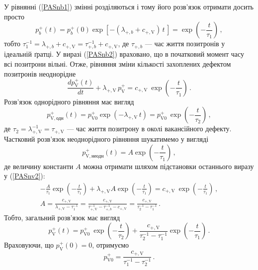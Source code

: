 У рівнянні (\ref{PASnb1}) змінні розділяються і тому його розв'язок отримати досить просто
\begin{equation}\label{PASnb2}
p_{b}^+(t)=p_{b}^+(0)\exp\left[-(\lambda_{+,b}+c_{+,\mathrm{V}})\,t\,\right]=\exp\left(-\frac{t}{\tau_1}\right)\,,
\end{equation}
тобто $\tau_1^{-1}=\lambda_{+,b}+c_{+,\mathrm{V}}=\tau_{+,b}^{-1}+c_{+,\mathrm{V}}$,
де $\tau_{+,b}$ --- час життя позитронів у ідеальній ґратці.
У виразі (\ref{PASnb2}) враховано, що в початковий момент часу всі позитрони вільні.
Отже, рівняння зміни кількості захоплених дефектом позитронів неоднорідне
\begin{equation}\label{PASnv2}
\frac{dp_{\mathrm{V}}^+(t)}{dt}+\lambda_{+,\mathrm{V}}\,p_{\mathrm{V}}^+=c_{+,\mathrm{V}}\:\exp\left(-\frac{t}{\tau_1}\right)\,.
\end{equation}
Розв'язок однорідного рівняння має вигляд
\begin{equation}
p_{\mathrm{V},\mbox{одн}}^+(t)=p_{\mathrm{V}0}^+\exp\left(-\lambda_{+,\mathrm{V}}\,t\right)
  =p_{\mathrm{V}0}^+\:\exp\left(-\frac{t}{\tau_2}\right)\,,
\end{equation}
де $\tau_2=\lambda_{+,\mathrm{V}}^{-1}=\tau_{+,\mathrm{V}}$ --- час життя позитрону в околі вакансійного дефекту.
Частковий розв'язок неоднорідного рівняння шукатимемо у вигляді
\begin{equation}
p_{\mathrm{V},\mbox{неодн}}^+(t)=A\exp\left(-\frac{t}{\tau_1}\right)\,,
\end{equation}
де величину константи $A$ можна отримати шляхом підстановки останнього виразу у (\ref{PASnv2}):
\begin{gather*}
-\frac{A}{\tau_1}\exp\left(-\frac{t}{\tau_1}\right)+\lambda_{+,\mathrm{V}}A\exp\left(-\frac{t}{\tau_1}\right)=c_{+,\mathrm{V}}\:\exp\left(-\frac{t}{\tau_1}\right)\,,\\
A=\frac{c_{+,\mathrm{V}}}{\lambda_{+,\mathrm{V}}-\tau_1^{-1}}= \frac{c_{+,\mathrm{V}}}{\tau_{+,\mathrm{V}}^{-1}-\tau_{+,b}^{-1}-c_{+,\mathrm{V}}}
=\frac{c_{+,\mathrm{V}}}{\tau_2^{-1}-\tau_1^{-1}}\,.
\end{gather*}
Тобто, загальний розв'язок має вигляд
\begin{equation}\label{PASnb3}
p_{\mathrm{V}}^+(t)=p_{\mathrm{V}0}^+\:\exp\left(-\frac{t}{\tau_2}\right)+\frac{c_{+,\mathrm{V}}}{\tau_2^{-1}-\tau_1^{-1}}\exp\left(-\frac{t}{\tau_1}\right)\,.
\end{equation}
Враховуючи,
що $p_{\mathrm{V}}^+(0)=0$, отримуємо
\begin{equation}\label{PASnb4}
p_{\mathrm{V}0}^+=\frac{c_{+,\mathrm{V}}}{\tau_1^{-1}-\tau_2^{-1}}\,.
\end{equation}
